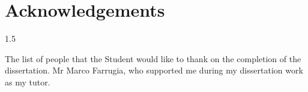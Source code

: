 
\chapter*{\centering Acknowledgements}
\begin{spacing}{1.5}
\vspace{-0.2in}
\setlength{\parskip}{0.3in}
\setlength{\parindent}{0in}


The list of people that the Student would like to thank on the completion of the dissertation.
Mr Marco Farrugia, who supported me during my dissertation work as my tutor.

\end{spacing}
\newpage
